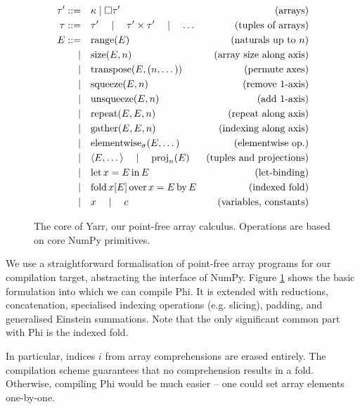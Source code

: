 \begin{figure}
    \centering
    \begin{align*}
    \tau' ::=& \quad\kappa \mid \Box \tau' &\text{(arrays)} \\
    \tau ::=& \quad\tau' \quad\mid\quad \tau' \times \tau' \quad\mid\quad \dots &\text{(tuples of arrays)} \\
    E ::=&\quad \mathrm{range}(E)   &\text{(naturals up to }n\text{)} \\
    \mid&\quad \mathrm{size}(E, n)  &\text{(array size along axis)} \\
    \mid&\quad \mathrm{transpose}(E, (n, \dots)) &\text{(permute axes)} \\ 
    \mid&\quad \mathrm{squeeze}(E, n) &\text{(remove 1-axis)} \\
    \mid&\quad \mathrm{unsqueeze}(E, n) &\text{(add 1-axis)} \\
    \mid&\quad \mathrm{repeat}(E, E, n) &\text{(repeat along axis)} \\
    \mid&\quad \mathrm{gather}(E, E, n) &\text{(indexing along axis)} \\ 
    \mid&\quad \mathrm{elementwise}_\sigma(E, \dots) &\text{(elementwise op.)} \\
    \mid&\quad \langle E, \dots \rangle \quad\mid\quad \mathrm{proj}_n(E) &\text{(tuples and projections)} \\
    \mid&\quad \mathrm{let}\,{x}={E}\,\mathrm{in}\,{E} &\text{(let-binding)} \\
    \mid&\quad \mathrm{fold}\,{x}[{E}]\,\mathrm{over}\,{x} = {E}\,\mathrm{by}\,{E} &\text{(indexed fold)} \\
    \mid&\quad x \quad\mid\quad c  &\text{(variables, constants)}
    \end{align*}
    \caption{The core of Yarr, our point-free array calculus. Operations are based on core NumPy primitives.}
    \label{fig:yarr-definition}
\end{figure}

We use a straightforward formalisation of point-free array programs for our compilation target, abstracting the interface of NumPy.
Figure \ref{fig:yarr-definition} shows the basic formulation into which we can compile Phi. It is extended with reductions, concatenation, specialised indexing operations (e.g. slicing), padding, and generalised Einstein summations. Note that the only significant common part with Phi is the indexed fold. 

In particular, indices $i$ from array comprehensions are erased entirely. The compilation scheme guarantees that no comprehension results in a fold. Otherwise, compiling Phi would be much easier -- one could set array elements one-by-one.

